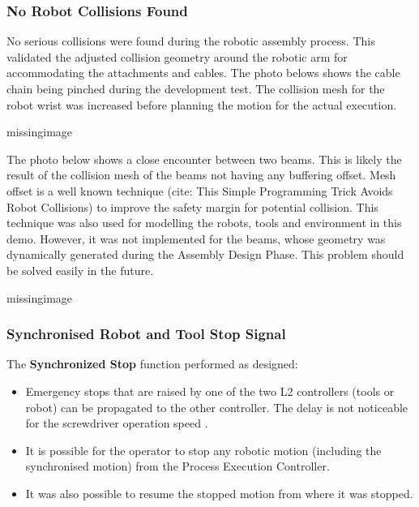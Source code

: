 \subsubsection{No Robot Collisions Found}
\label{subsubsection:exploration-4-no-robot-collisions-found}

No serious collisions were found during the robotic assembly process. This validated the adjusted collision geometry around the robotic arm for accommodating the attachments and cables. The photo belows shows the cable chain being pinched during the development test. The collision mesh for the robot wrist was increased before planning the motion for the actual execution.

missingimage

The photo below shows a close encounter between two beams. This is likely the result of the collision mesh of the beams not having any buffering offset. Mesh offset is a well known technique (cite: This Simple Programming Trick Avoids Robot Collisions) to improve the safety margin for potential collision. This technique was also used for modelling the robots, tools and environment in this demo. However, it was not implemented for the beams, whose geometry was dynamically generated during the Assembly Design Phase. This problem should be solved easily in the future.

missingimage

\subsubsection{Synchronised Robot and Tool Stop Signal}
\label{subsubsection:exploration-4-synchronised-robot-and-tool-stop-signal}

The \textbf{Synchronized Stop} function  performed as designed:
\begin{itemize}
    \item Emergency stops that are raised by one of the two L2 controllers (tools or robot) can be propagated to the other controller. The delay is not noticeable for the screwdriver operation speed .
    \item It is possible for the operator to stop any robotic motion (including the synchronised motion) from the Process Execution Controller.
    \item It was also possible to resume the stopped motion from where it was stopped.
\end{itemize}

